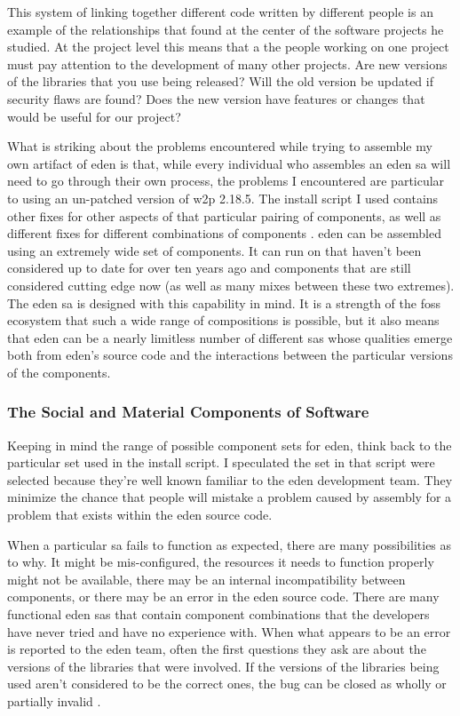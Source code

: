 \documentclass[a4paper,man,natbib,floatsintext]{apa6}
\begin{document}
   This system of linking together different code written by different people is an example of the relationships that \citet{Mackenzie2006-hb} found at the center of the software projects he studied. At the project level this means that a the people working on one project must pay attention to the development of many other projects. Are new versions of the libraries that you use being released? Will the old version be updated if security flaws are found? Does the new version have features or changes that would be useful for our project? 

   What is striking about the problems encountered while trying to assemble my own artifact of \acrshort{eden} is that, while every individual who assembles an \acrshort{eden} \gls{sa} will need to go through their own process, the problems I encountered are particular to using an un-patched version of \gls{w2p} 2.18.5. The install script I used contains other fixes for other aspects of that particular pairing of components, as well as different fixes for different combinations of components \citep{Sahana_Foundation2018-eq}. \acrshort{eden} can be assembled using an extremely wide set of components. It can run on that haven't been considered up to date for over ten years ago and components that are still considered cutting edge now (as well as many mixes between these two extremes). The \acrshort{eden} \gls{sa} is designed with this capability in mind. It is a strength of the \acrshort{foss} ecosystem that such a wide range of compositions is possible, but it also means that \acrshort{eden} can be a nearly limitless number of different \glspl{sa} whose qualities emerge both from \acrshort{eden}'s source code and the interactions between the particular versions of the components.

   \subsubsection{The Social and Material Components of Software}
   Keeping in mind the range of possible component sets for \acrshort{eden}, think back to the particular set used in the install script. I speculated the set in that script were selected because they're well known familiar to the \acrshort{eden} development team. They minimize the chance that people will mistake a problem caused by assembly for a problem that exists within the \acrshort{eden} source code.  

   When a particular \gls{sa} fails to function as expected, there are many possibilities as to why. It might be mis-configured, the resources it needs to function properly might not be available, there may be an internal incompatibility between components, or there may be an error in the \acrshort{eden} source code. There are many functional \acrshort{eden} \glspl{sa} that contain component combinations that the developers have never tried and have no experience with. When what appears to be an error is reported to the \acrshort{eden} team, often the first questions they ask are about the versions of the libraries that were involved. If the versions of the libraries being used aren't considered to be the correct ones, the bug can be closed as wholly or partially invalid \citep{Trendspotter2020-ps}.
\end{document}
